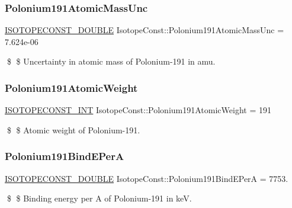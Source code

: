 \subsubsection{\texorpdfstring{Polonium191\+Atomic\+Mass\+Unc}{Polonium191AtomicMassUnc}}
{\footnotesize\ttfamily \mbox{\hyperlink{group___isotope_const-_macros_ga8f45a7272ce02c0b4c65c44636ed719a}{I\+S\+O\+T\+O\+P\+E\+C\+O\+N\+S\+T\+\_\+\+D\+O\+U\+B\+LE}} Isotope\+Const\+::\+Polonium191\+Atomic\+Mass\+Unc = 7.\+624e-\/06}

\$ \$ Uncertainty in atomic mass of Polonium-\/191 in amu. \mbox{\label{group___isotope_const-_polonium-_po191_gabca74a9aaa7d4da178033d8fc9769201}} 
\subsubsection{\texorpdfstring{Polonium191\+Atomic\+Weight}{Polonium191AtomicWeight}}
{\footnotesize\ttfamily \mbox{\hyperlink{group___isotope_const-_macros_ga5f18360b3e99483a35c32d789e62621c}{I\+S\+O\+T\+O\+P\+E\+C\+O\+N\+S\+T\+\_\+\+I\+NT}} Isotope\+Const\+::\+Polonium191\+Atomic\+Weight = 191}

\$ \$ Atomic weight of Polonium-\/191. \mbox{\label{group___isotope_const-_polonium-_po191_gaf3568167ae19929a800f1466fa3a4d94}} 
\subsubsection{\texorpdfstring{Polonium191\+Bind\+E\+PerA}{Polonium191BindEPerA}}
{\footnotesize\ttfamily \mbox{\hyperlink{group___isotope_const-_macros_ga8f45a7272ce02c0b4c65c44636ed719a}{I\+S\+O\+T\+O\+P\+E\+C\+O\+N\+S\+T\+\_\+\+D\+O\+U\+B\+LE}} Isotope\+Const\+::\+Polonium191\+Bind\+E\+PerA = 7753.}

\$ \$ Binding energy per A of Polonium-\/191 in keV. \mbox{\label{group___isotope_const-_polonium-_po191_gaa7f89499c98e8e6a7b77ec824dcff9e2}} 
